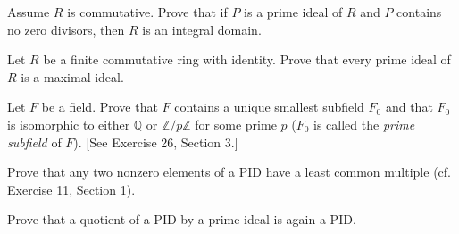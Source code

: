 \documentclass[12pt,letterpaper]{hmcpset}
\newcommand{\Zz}{\mathbb{Z}}
\newcommand{\Qq}{\mathbb{Q}}
\begin{document}

\begin{problem}[7.4.10]
	Assume $R$ is commutative. Prove that if $P$ is a prime ideal of $R$ and $P$ contains no zero divisors, then $R$ is an integral domain.
\end{problem}

\begin{solution}
\vfill
\end{solution}
\newpage

\begin{problem}[7.4.19]
	Let $R$ be a finite commutative ring with identity. Prove that every prime ideal of $R$ is a maximal ideal.
\end{problem}

\begin{solution}
\vfill
\end{solution}
\newpage

\begin{problem}
	Let $F$ be a field. Prove that $F$ contains a unique smallest subfield $F_0$ and that $F_0$ is isomorphic to either $\Qq$ or $\Zz/p\Zz$ for some prime $p$ ($F_0$ is called the \emph{prime subfield} of $F$). [See Exercise 26, Section 3.]
\end{problem}

\begin{problem}[8.2.2]
  Prove that any two nonzero elements of a PID have a least common multiple (cf. Exercise 11, Section 1).
\end{problem}
\begin{solution}
\vfill
\end{solution}
\newpage

\begin{problem}[8.2.3]
	Prove that a quotient of a PID by a prime ideal is again a PID.
\end{problem}
\begin{solution}
	\vfill
\end{solution}
\newpage
\end{document}
